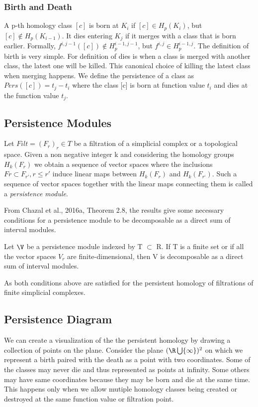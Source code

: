 \subsubsection{Birth and Death}
A p-th homology class $[c]$ is born at $K_i$ if $[c] \in H_p(K_i)$, but $[c] \not\in H_p(K_{i-1})$. It dies entering $K_j$ if it merges with a class that is born earlier. Formally, $f^{i, j-1}([c]) \not\in H^{i-1, j-1}_p$, but $f^{i,j} \in H^{i-1, j}_p$. 
The definition of birth is very simple. 
For definition of dies is when a class is merged with another class, the latest one will be killed. This canonical choice of killing the latest class when merging happens. We define the persistence of a class as $Pers([c]) = t_j - t_i$ where the class [c] is born at function value $t_i$ and dies at the function value $t_j$. 

\subsection{Persistence Modules}

\begin{definition} Let $Filt = (F_r)_r \in T$ be a filtration of a simplicial complex or a topological space. Given a non negative integer k and considering the homology groups $H_k(F_r)$ we obtain a sequence of vector spaces where the inclusions $Fr \subset F_{r'}, r \leq r'$ induce linear maps between $H_k(F_r)$ and $H_k(F_{r‘})$. Such a sequence of vector spaces together with the linear maps connecting them is called a \textit{persistence module}.
\end{definition}
From Chazal et al., 2016a, Theorem 2.8, the results give some necessary conditions for a persistence module to be decomposable as a direct sum of interval modules.
\begin{theorem}
Let $\V$ be a persistence module indexed by T $\subset$ R. If T is a finite set or if all
the vector spaces $V_r$ are finite-dimensional, then V is decomposable as a direct sum of interval
modules.
\end{theorem}
As both conditions above are satisfied for the persistent homology of filtrations of finite
simplicial complexes. 

\subsection{Persistence Diagram}
We can create a visualization  of the the persistent homology by drawing a collection of points on the plane. Consider the plane $( \R \bigcup \{\infty\})^2$ on which we represent a birth paired with the death as a point with two coordinates. Some of the classes may never die and thus represented as points at infinity. Some others may have same coordinates because they may be born and die at the same time. This happens only when we allow mutiple homology classes being created or destroyed at the same function value or filtration point.

